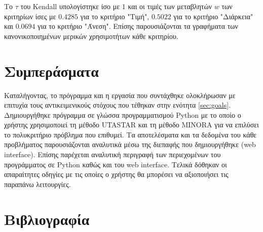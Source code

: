 \documentclass[11pt,a4paper,titlepage]{article}
\numberwithin{equation}{section}
\begin{document}
Το $τ$ του Kendall υπολογίστηκε ίσο με $1$ και οι τιμές των μεταβλητών $w$ των κριτηρίων ίσες με $0.4285$ για το κριτήριο "Τιμή", $0.5022$ για το κριτήριο "Διάρκεια" και $0.0694$ για το κριτήριο "Άνεση". Επίσης παρουσιάζονται τα γραφήματα των κανονικοποιημένων μερικών χρησιμοτήτων κάθε κριτηρίου. 

\section{Συμπεράσματα}
\label{sec:conclusion}
Καταλήγοντας, το πρόγραμμα και η εργασία που συντάχθηκε ολοκλήρωσαν με επιτυχία τους αντικειμενικούς στόχους που τέθηκαν στην ενότητα \ref{sec:goals}. Δημιουργήθηκε πρόγραμμα σε γλώσσα προγραμματισμού Python με το οποίο ο χρήστης χρησιμοποιεί τη μέθοδο UTASTAR και τη μέθοδο MINORA για να επιλύσει το πολυκριτήριο πρόβλημα που επιθυμεί. Τα αποτελέσματα και τα δεδομένα του κάθε προβλήματος παρουσιάζονται αναλυτικά μέσω της διεπαφής που δημιουργήθηκε (web interface). Επίσης παρέχεται αναλυτική περιγραφή των περιεχομένων του προγράμματος σε Python καθώς και του web interface. Τελικά δόθηκαν οι απαραίτητες οδηγίες με τις οποίες ο χρήστης θα μπορέσει να αξιοποιήσει τις παραπάνω λειτουργίες.

\section{Βιβλιογραφία}
\label{sec:bibliography}
\nocite{utastar-lecture}
\nocite{utastar-book}
\nocite{sya-book}

\printbibliography
\end{document}
